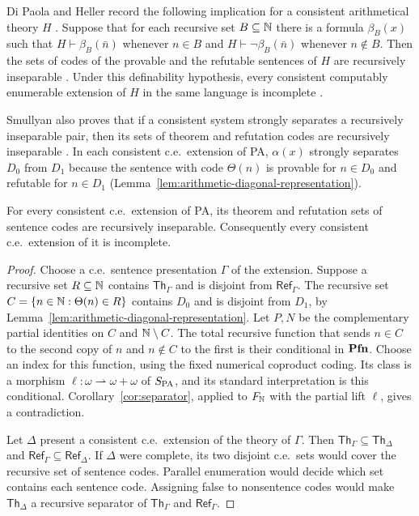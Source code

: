 Di Paola and Heller record the following implication for a consistent
arithmetical theory $H$ \cite[p.~595, (3)]{DPH}. Suppose that for
each recursive set $B\subseteq\mathbb N$ there is a formula $\beta_B(x)$
such that $H\vdash\beta_B(\bar n)$ whenever $n\in B$ and
$H\vdash\neg\beta_B(\bar n)$ whenever $n\notin B$.
Then the sets of codes of the provable and the refutable sentences
of $H$ are recursively inseparable
\cite[Chapter~III, \S16, Theorem~22, p.~59]{Smullyan}.
Under this definability hypothesis,
every consistent computably enumerable extension of $H$ in the same language
is incomplete
\cite[Chapter~III, \S15, corollary to Theorem~21, p.~58]{Smullyan}.

Smullyan also proves that if a consistent system strongly separates a
recursively inseparable pair, then its sets of theorem and refutation
codes are recursively inseparable
\cite[Chapter~III, \S17, Theorem~23(b), pp.~59--60]{Smullyan}.
In each consistent c.e.\ extension of PA, $\alpha(x)$ strongly separates
$D_0$ from $D_1$ because the sentence with code $\Theta(n)$ is provable
for $n\in D_0$ and refutable for $n\in D_1$
(Lemma~\ref{lem:arithmetic-diagonal-representation}).

\begin{corollary}
\label{cor:arithmetic}
\label{thm:arithmetic-comparison-inseparability}
For every consistent c.e.\ extension of PA, its theorem and
refutation sets of sentence codes are recursively inseparable.
Consequently every consistent c.e.\ extension of it is incomplete.
\end{corollary}
\begin{proof}
Choose a c.e.\ sentence presentation $\Gamma$ of the extension.
Suppose a recursive set $R\subseteq\mathbb N$ contains
$\mathsf{Th}_\Gamma$ and is disjoint from
$\mathsf{Ref}_\Gamma$. The recursive set
$C=\{n\in\mathbb N:\Theta(n)\in R\}$
contains $D_0$ and is disjoint from $D_1$, by
Lemma~\ref{lem:arithmetic-diagonal-representation}.
Let $P,N$ be the complementary partial identities on $C$ and
$\mathbb N\setminus C$. The total recursive function that sends
$n\in C$ to the second copy of $n$ and $n\notin C$ to the
first is their conditional in $\mathbf{Pfn}$.
Choose an index for this function, using the fixed numerical
coproduct coding. Its class is a morphism
$\ell:\omega\rightharpoonup\omega+\omega$ of $S_{\mathrm{PA}}$,
and its standard interpretation is this conditional.
Corollary~\ref{cor:separator}, applied to $F_{\mathbb N}$ with the
partial lift $\ell$, gives a contradiction.

Let $\Delta$ present a consistent c.e.\ extension of the theory of
$\Gamma$. Then $\mathsf{Th}_\Gamma\subseteq\mathsf{Th}_\Delta$ and
$\mathsf{Ref}_\Gamma\subseteq\mathsf{Ref}_\Delta$. If $\Delta$ were
complete, its two disjoint c.e.\ sets would cover the recursive set of
sentence codes. Parallel enumeration would decide which set contains
each sentence code. Assigning false to nonsentence codes would make
$\mathsf{Th}_\Delta$ a recursive separator of
$\mathsf{Th}_\Gamma$ and $\mathsf{Ref}_\Gamma$.
\end{proof}

